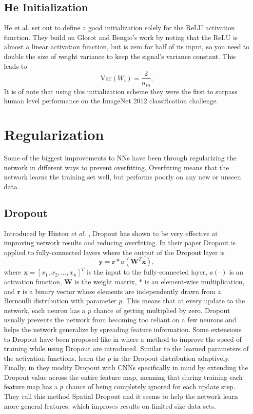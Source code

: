 \subsection{He Initialization}
He et al. set out to define a good initialization solely for the ReLU activation function.
They build on Glorot and Bengio's work by noting that the ReLU is almost a linear activation function, but is zero for half of its input, so you need to double the size of weight variance to keep the signal’s variance constant.
This leads to 
\begin{equation}
\mbox{Var}(W_i) = \frac{2}{n_{in}}.
\label{eq:heinit}
\end{equation}
It is of note that using this initialization scheme they were the first to surpass human level performance on the ImageNet 2012 classification challenge.


\section{Regularization}
Some of the biggest improvements to NNs have been through regularizing the network in different ways to prevent overfitting.
Overfitting means that the network learns the training set well, but performs poorly on any new or unseen data.

\subsection{Dropout}
Introduced by Hinton \textit{et al.} \cite{hinton2012improving}, Dropout has shown to be very effective at improving network results and reducing overfitting. 
In their paper Dropout is applied to fully-connected layers where the output of the Dropout layer is 
\begin{equation}
\textbf{y} = \textbf{r} \ast a(\textbf{W}^T\textbf{x}), 
\label{eq:dropout}
\end{equation}
where $\textbf{x} = [x_1,x_2,...,x_n]^T$ is the input to the fully-connected layer, $a(\cdot)$ is an activation function, $\textbf{W}$ is the weight matrix, $\ast$ is an element-wise multiplication, and $\textbf{r}$ is a binary vector whose elements are independently drawn from a Bernoulli distribution with parameter $p$. 
This means that at every update to the network, each neuron has a $p$ chance of getting multiplied by zero. 
Dropout usually prevents the network from becoming too reliant on a few neurons and helps the network generalize by spreading feature information. 
Some extensions to Dropout have been proposed like in \cite{wang2013fast} where a method to improve the speed of training while using Dropout are introduced. 
Similar to the learned parameters of the activation functions, \cite{ba2013adaptive} learn the $p$ in the Dropout distribution adaptively. 
Finally, in \cite{tompson2015efficient} they modify Dropout with CNNs specifically in mind by extending the Dropout value across the entire feature map, meaning that during training each feature map has a $p$ chance of being completely ignored for each update step. 
They call this method Spatial Dropout and it seems to help the network learn more general features, which improves results on limited size data sets.

